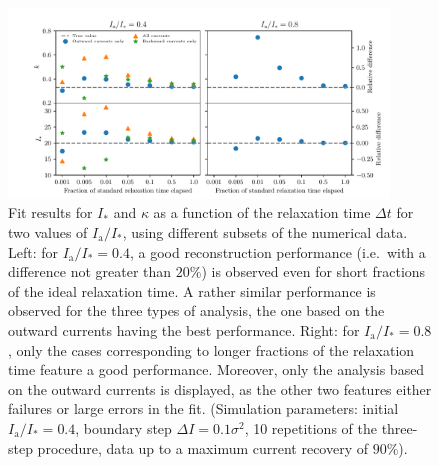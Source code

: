 \begin{figure}[t]
    \centering
    \includegraphics[width=0.9\textwidth]{4_probing_the_diffusive_behavior/figs/final/better_plot.pdf}
    \caption{Fit results for $I_\ast$ and $\kappa$ as a function of the relaxation time $\Delta t$ for two values of $I_\mathrm{a}/I_\ast$, using different subsets of the numerical data. Left: for $I_\mathrm{a}/I_\ast=0.4$, a good reconstruction performance  {(i.e.\ with a difference not greater than $20\%$)} is observed even for short fractions of the ideal relaxation time. A rather similar performance is observed for the three types of analysis, the one based on the outward currents having the best performance. Right: for $I_\mathrm{a} / I_\ast=0.8$, only the cases corresponding to longer fractions of the relaxation time feature a good performance. Moreover, only the analysis based on the outward currents is displayed, as the other two features either failures or large errors in the fit. (Simulation parameters: initial $I_\mathrm{a}/I_\ast=0.4$, boundary step $\Delta I =0.1 \sigma^2$, 10 repetitions of the three-step procedure, data up to a maximum current recovery of $90\%$).}
    \label{fig:all_different_time}
\end{figure}
%

